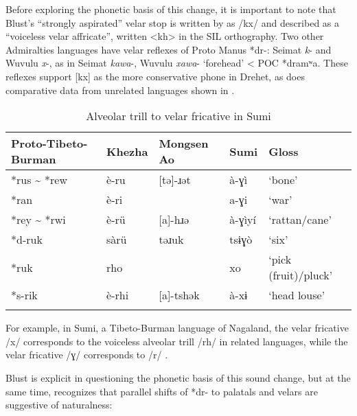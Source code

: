 \documentclass[output=paper]{langscibook}
\begin{document}
Before exploring the phonetic basis of this change, it is important to note that Blust’s “strongly aspirated” velar stop is written by \citet{Beard1992} as \mbox{/kx/} and described as a “voiceless velar affricate”, written <kh> in the SIL orthography. Two other Admiralties languages have velar reflexes of Proto Manus *dr-: Seimat \textit{k}- and Wuvulu \textit{x}-, as in Seimat \textit{kawa}-, Wuvulu \textit{xawa}- ‘forehead’ < POC *dramʷa. These reflexes support [kx] as the more conservative phone in Drehet, as does comparative data from unrelated languages shown in .

\begin{table}
\begin{tabularx}{\textwidth}{lXlXl}
\lsptoprule
{Proto-Tibeto-Burman} & {Khezha} & {Mongsen} {Ao} & {Sumi} & {Gloss}\\
\midrule
*rus {\textasciitilde} *rew & è-ru & [tə]-ɹət & à-ɣì & ‘bone’\\
*ran & è-ri &  & a-ɣi & ‘war’\\
*rey {\textasciitilde} *rwi & è-rü{}  & [a]-hɹə & à-ɣìyí & ‘rattan/cane’\\
*d-ruk & sàrü & təɹuk & tsɨɣò & ‘six’\\
*ruk & rho &  & xo & ‘pick (fruit)/pluck’\\
*s-rik & è-rhi & [a]-tshək & à-xɨ & ‘head louse’\\
\lspbottomrule
\end{tabularx}
  \caption{\label{tab:blevins:13} Alveolar trill to velar fricative in Sumi \citep[52--53]{Teo2009}}
\end{table}

For example, in Sumi, a Tibeto-Burman language of Nagaland, the velar fricative \mbox{/x/} corresponds to the voiceless alveolar trill \mbox{/rh/} in related languages, while the velar fricative \mbox{/ɣ/} corresponds to \mbox{/r/} \citep[52--53]{Teo2009}.

Blust is explicit in questioning the phonetic basis of this sound change, but at the same time, recognizes that parallel shifts of *dr- to palatals and velars are suggestive of naturalness:
\end{document}
